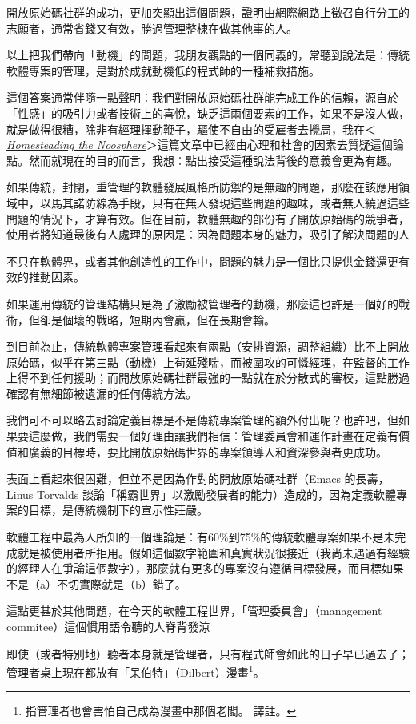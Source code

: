 \documentclass[12pt,]{article}
\makeatletter
\newcommand*{\shifttext}[2]{%
  \settowidth{\@tempdima}{#2}%
  \makebox[\@tempdima]{\hspace*{#1}#2}%
}
\makeatother
\begin{document}
開放原始碼社群的成功，更加突顯出這個問題，證明由網際網路上徵召自行分工的志願者，通常省錢又有效，勝過管理整棟在做其他事的人。

以上把我們帶向「動機」的問題，我朋友觀點的一個同義的，常聽到說法是︰傳統軟體專案的管理，是對於成就動機低的程式師的一種補救措施。

這個答案通常伴隨一點聲明︰我們對開放原始碼社群能完成工作的信賴，源自於「性感」的吸引力或者技術上的喜悅，缺乏這兩個要素的工作，如果不是沒人做，就是做得很糟，除非有經理揮動鞭子，驅使不自由的受雇者去攪局，我在＜\href{http://www.tuxedo.org/~esr/magic-cauldron/}{\emph{Homesteading
the
Noosphere}}＞這篇文章中已經由心理和社會的因素去質疑這個論點。然而就現在的目的而言，我想︰點出接受這種說法背後的意義會更為有趣。

如果傳統，封閉，重管理的軟體發展風格所防禦的是無趣的問題，那麼在該應用領域中，以馬其諾防線為手段，只有在無人發現這些問題的趣味，或者無人繞過這些問題的情況下，才算有效。但在目前，軟體無趣的部份有了開放原始碼的競爭者，使用者將知道最後有人處理的原因是︰因為問題本身的魅力，吸引了解決問題的人
\shifttext{1pt}{---}\shifttext{-1pt}{---}
不只在軟體界，或者其他創造性的工作中，問題的魅力是一個比只提供金錢還更有效的推動因素。

如果運用傳統的管理結構只是為了激勵被管理者的動機，那麼這也許是一個好的戰術，但卻是個壞的戰略，短期內會贏，但在長期會輸。

到目前為止，傳統軟體專案管理看起來有兩點（安排資源，調整組織）比不上開放原始碼，似乎在第三點（動機）上茍延殘喘，而被圍攻的可憐經理，在監督的工作上得不到任何援助；而開放原始碼社群最強的一點就在於分散式的審校，這點勝過確認有無細節被遺漏的任何傳統方法。

我們可不可以略去討論定義目標是不是傳統專案管理的額外付出呢？也許吧，但如果要這麼做，我們需要一個好理由讓我們相信︰管理委員會和運作計畫在定義有價值和廣義的目標時，要比開放原始碼世界的專案領導人和資深參與者更成功。

表面上看起來很困難，但並不是因為作對的開放原始碼社群（Emacs 的長壽，Linus
Torvalds
談論「稱霸世界」以激勵發展者的能力）造成的，因為定義軟體專案的目標，是傳統機制下的宣示性莊嚴。

軟體工程中最為人所知的一個理論是︰有60\%到75\%的傳統軟體專案如果不是未完成就是被使用者所拒用。假如這個數字範圍和真實狀況很接近（我尚未遇過有經驗的經理人在爭論這個數字），那麼就有更多的專案沒有遵循目標發展，而目標如果不是（a）不切實際就是（b）錯了。

這點更甚於其他問題，在今天的軟體工程世界，「管理委員會」（management
commitee）這個慣用語令聽的人脊背發涼 \shifttext{1pt}{---}\shifttext{-1pt}{---}
即使（或者特別地）聽者本身就是管理者，只有程式師會如此的日子早已過去了；管理者桌上現在都放有「呆伯特」（Dilbert）漫畫\footnote{指管理者也會害怕自己成為漫畫中那個老闆。
  \shifttext{1pt}{---}\shifttext{-1pt}{---} 譯註。}。
\end{document}
